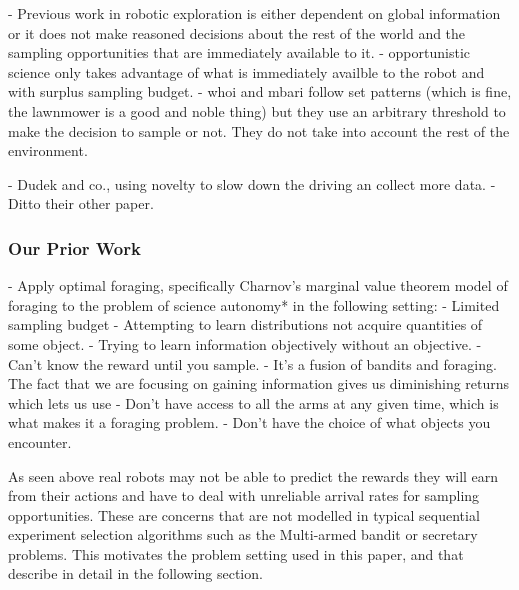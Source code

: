 	- Previous work in robotic exploration is either dependent on global information or it does not make reasoned decisions about the rest of the world and the sampling opportunities that are immediately available to it.
			- opportunistic science only takes advantage of what is immediately availble to the robot and with surplus sampling budget.
			- whoi and mbari follow set patterns (which is fine, the lawnmower is a good and noble thing) but they use an arbitrary threshold to make the decision to sample or not.  They do not take into account the rest of the environment.


	- Dudek and co., using novelty to slow down the driving an collect more data.
		- Ditto their other paper.

\subsubsection{Our Prior Work}
		- Apply optimal foraging, specifically Charnov's marginal value theorem
		model of foraging to the problem of science autonomy* in the following setting:	
			- Limited sampling budget
			- Attempting to learn distributions not acquire quantities of some object.
			- Trying to learn information objectively without an objective. 
			- Can't know the reward until you sample.
			- It's a fusion of bandits and foraging.  The fact that we are focusing on gaining information gives us diminishing returns which lets us use 
			- Don't have access to all the arms at any given time, which is what makes it a foraging problem.
			- Don't have the choice of what objects you encounter.

As seen above real robots may not be able to predict the rewards they will earn from their actions and have to deal with unreliable arrival rates for sampling opportunities.  These are concerns that are not modelled in typical sequential experiment selection algorithms such as the Multi-armed bandit or secretary problems.  This motivates the problem setting used in this paper, and that describe in detail in the following section.
